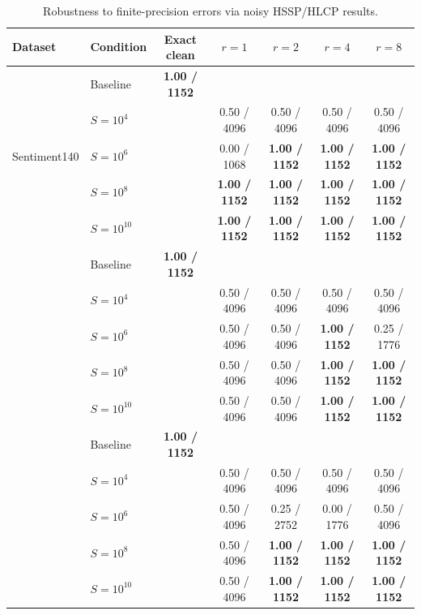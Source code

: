 \begin{table}[t]
\centering
\label{tab:truncation-single-trial}
\begin{tabular}{llccccc}
\toprule
Dataset & Condition & Exact clean & $r=1$ & $r=2$ & $r=4$ & $r=8$ \\
\midrule
\multirow{5}{*}{Sentiment140} & Baseline & \textbf{1.00 / 1152} & \text{--} & \text{--} & \text{--} & \text{--} \\
& $S=10^{4}$ & \text{--} & 0.50 / 4096 & 0.50 / 4096 & 0.50 / 4096 & 0.50 / 4096 \\
& $S=10^{6}$ & \text{--} & 0.00 / 1068 & \textbf{1.00 / 1152} & \textbf{1.00 / 1152} & \textbf{1.00 / 1152} \\
& $S=10^{8}$ & \text{--} & \textbf{1.00 / 1152} & \textbf{1.00 / 1152} & \textbf{1.00 / 1152} & \textbf{1.00 / 1152} \\
& $S=10^{10}$ & \text{--} & \textbf{1.00 / 1152} & \textbf{1.00 / 1152} & \textbf{1.00 / 1152} & \textbf{1.00 / 1152} \\
\addlinespace
\multirow{5}{*}{Purchase} & Baseline & \textbf{1.00 / 1152} & \text{--} & \text{--} & \text{--} & \text{--} \\
& $S=10^{4}$ & \text{--} & 0.50 / 4096 & 0.50 / 4096 & 0.50 / 4096 & 0.50 / 4096 \\
& $S=10^{6}$ & \text{--} & 0.50 / 4096 & 0.50 / 4096 & \textbf{1.00 / 1152} & 0.25 / 1776 \\
& $S=10^{8}$ & \text{--} & 0.50 / 4096 & 0.50 / 4096 & \textbf{1.00 / 1152} & \textbf{1.00 / 1152} \\
& $S=10^{10}$ & \text{--} & 0.50 / 4096 & 0.50 / 4096 & \textbf{1.00 / 1152} & \textbf{1.00 / 1152} \\
\addlinespace
\multirow{5}{*}{CIFAR} & Baseline & \textbf{1.00 / 1152} & \text{--} & \text{--} & \text{--} & \text{--} \\
& $S=10^{4}$ & \text{--} & 0.50 / 4096 & 0.50 / 4096 & 0.50 / 4096 & 0.50 / 4096 \\
& $S=10^{6}$ & \text{--} & 0.50 / 4096 & 0.25 / 2752 & 0.00 / 1776 & 0.50 / 4096 \\
& $S=10^{8}$ & \text{--} & 0.50 / 4096 & \textbf{1.00 / 1152} & \textbf{1.00 / 1152} & \textbf{1.00 / 1152} \\
& $S=10^{10}$ & \text{--} & 0.50 / 4096 & \textbf{1.00 / 1152} & \textbf{1.00 / 1152} & \textbf{1.00 / 1152} \\
\bottomrule
\end{tabular}
\caption{Robustness to finite-precision errors via noisy HSSP/HLCP results.}
\end{table}
